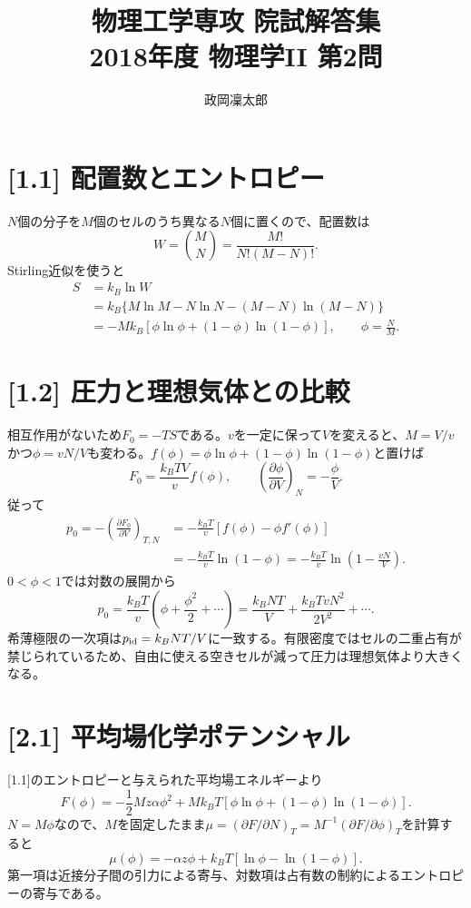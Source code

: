 \documentclass[11pt,a4paper]{article}
\title{物理工学専攻 院試解答集\\2018年度 物理学II 第2問}
\author{政岡凜太郎}
\date{}
\begin{document}
\maketitle

\section*{[1.1] 配置数とエントロピー}
$N$個の分子を$M$個のセルのうち異なる$N$個に置くので、配置数は
\begin{equation}
 W=\binom{M}{N}=\frac{M!}{N!(M-N)!}.
\end{equation}
Stirling近似を使うと
\begin{align}
 S&=k_B\ln W\\
 &=k_B\{M\ln M-N\ln N-(M-N)\ln(M-N)\}\\
 &=-Mk_B\left[\phi\ln\phi+(1-\phi)\ln(1-\phi)\right],
 \qquad \phi=\frac NM.
\end{align}

\section*{[1.2] 圧力と理想気体との比較}
相互作用がないため$F_0=-TS$である。$v$を一定に保って$V$を変えると、$M=V/v$かつ$\phi=vN/V$も変わる。$f(\phi)=\phi\ln\phi+(1-\phi)\ln(1-\phi)$と置けば
\begin{equation}
 F_0=\frac{k_BT V}{v}f(\phi),\qquad
 \left(\frac{\partial\phi}{\partial V}\right)_{N}=-\frac{\phi}{V}.
\end{equation}
従って
\begin{align}
 p_0=-\left(\frac{\partial F_0}{\partial V}\right)_{T,N}
 &=-\frac{k_BT}{v}\left[f(\phi)-\phi f'(\phi)\right]\\
 &=-\frac{k_BT}{v}\ln(1-\phi)
 =\boxed{-\frac{k_BT}{v}\ln\left(1-\frac{vN}{V}\right)}.
\end{align}
$0<\phi<1$では対数の展開から
\begin{equation}
 p_0=\frac{k_BT}{v}\left(\phi+\frac{\phi^2}{2}+\cdots\right)
 =\frac{k_BNT}{V}+\frac{k_BTvN^2}{2V^2}+\cdots.
\end{equation}
希薄極限の一次項は$p_{\rm id}=k_BNT/V$に一致する。有限密度ではセルの二重占有が禁じられているため、自由に使える空きセルが減って圧力は理想気体より大きくなる。

\section*{[2.1] 平均場化学ポテンシャル}
[1.1]のエントロピーと与えられた平均場エネルギーより
\begin{equation}
 F(\phi)=-\frac12 Mz\alpha\phi^2+Mk_BT\left[\phi\ln\phi+(1-\phi)\ln(1-\phi)\right].
\end{equation}
$N=M\phi$なので、$M$を固定したまま$\mu=(\partial F/\partial N)_T=M^{-1}(\partial F/\partial\phi)_T$を計算すると
\begin{equation}
 \boxed{\mu(\phi)=-\alpha z\phi+k_BT\left[\ln\phi-\ln(1-\phi)\right]}.
\end{equation}
第一項は近接分子間の引力による寄与、対数項は占有数の制約によるエントロピーの寄与である。
\end{document}
